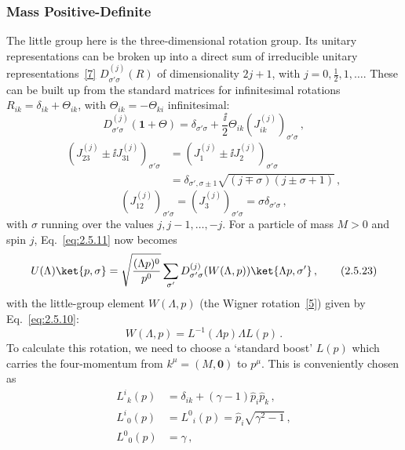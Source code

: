 \subsubsection*{Mass Positive-Definite}

The little group here is the three-dimensional rotation group. Its unitary
representations can be broken up into a direct sum of irreducible unitary
representations~\hyperref[ref:2.7]{[7]} $D^{(j)}_{\sigma'\sigma}(R)$ of dimensionality
$2j+1$, with $j=0,\tfrac12,1,\ldots$. These can be built up from the standard
matrices for infinitesimal rotations $R_{ik}=\delta_{ik}+\Theta_{ik}$, with
$\Theta_{ik}=-\Theta_{ki}$ infinitesimal:
\begin{equation}
D^{(j)}_{\sigma'\sigma}(\mathbf{1}+\Theta)
=\delta_{\sigma'\sigma}
+\frac{\ii}{2}\Theta_{ik}(J^{(j)}_{ik})_{\sigma'\sigma}\,,
\tag{2.5.20}\label{eq:2.5.20}
\end{equation}
\begin{equation}
\begin{aligned}
(J^{(j)}_{23}\pm \ii J^{(j)}_{31})_{\sigma'\sigma}
&=(J^{(j)}_1\pm \ii J^{(j)}_2)_{\sigma'\sigma}\\
&=\delta_{\sigma',\sigma\pm1}
\sqrt{(j\mp\sigma)(j\pm\sigma+1)}\,,
\end{aligned}
\tag{2.5.21}\label{eq:2.5.21}
\end{equation}
\begin{equation}
(J^{(j)}_{12})_{\sigma'\sigma}
=(J^{(j)}_3)_{\sigma'\sigma}
=\sigma\delta_{\sigma'\sigma}\,,
\tag{2.5.22}\label{eq:2.5.22}
\end{equation}
with $\sigma$ running over the values $j,j-1,\ldots,-j$. For a particle of
mass $M>0$ and spin $j$, Eq.~\eqref{eq:2.5.11} now becomes
\begin{equation}
U(\Lambda)\ket{p,\sigma}
=\sqrt{\frac{(\Lambda p)^0}{p^0}}
\sum_{\sigma'}D^{(j)}_{\sigma'\sigma}(W(\Lambda,p))
\ket{\Lambda p,\sigma'}\,,
\tag{2.5.23}\label{eq:2.5.23}
\end{equation}
with the little-group element $W(\Lambda,p)$ (the Wigner
rotation~\hyperref[ref:2.5]{[5]}) given by Eq.~\eqref{eq:2.5.10}:
\[
W(\Lambda,p)=L^{-1}(\Lambda p)\Lambda L(p)\,.
\]
To calculate this rotation, we need to choose a `standard boost' $L(p)$ which
carries the four-momentum from $k^\mu=(M,\mathbf{0})$ to $p^\mu$. This is
conveniently chosen as
\begin{equation}
\begin{aligned}
L^i{}_k(p)&=\delta_{ik}+(\gamma-1)\hat p_i\hat p_k\,,\\
L^i{}_0(p)&=L^0{}_i(p)=\hat p_i\sqrt{\gamma^2-1}\,,\\
L^0{}_0(p)&=\gamma\,,
\end{aligned}
\tag{2.5.24}\label{eq:2.5.24}
\end{equation}
